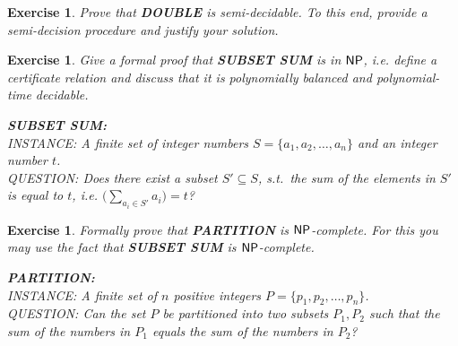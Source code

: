 \documentclass [11pt]{article}
\newtheorem{exercise}[theorem]{Exercise}
\newcommand{\ccfont}[1]{\protect\mathsf{#1}}
\newcommand{\NP}{\ccfont{NP}}
\newcommand{\solution}[1]{\noindent {\bf Solution.}  #1}
\begin{document}
\begin{exercise}
 Prove that \textbf{DOUBLE} is semi-decidable. To this end, provide a semi-decision procedure and justify your solution.
\end{exercise}




\begin{exercise}
  Give a formal proof that \textbf{SUBSET SUM} is in $\NP$, i.e. define a
  certificate relation and discuss that it is polynomially balanced and
  polynomial-time decidable.
  
\medskip

\noindent \textbf{SUBSET SUM:} \\
INSTANCE: A finite set of integer numbers $S=\{a_1, a_2, \ldots, a_n\}$ and an integer number $t$. \\
QUESTION: Does there exist a subset $S'\subseteq S$, s.t.\ the sum of the elements in $S'$  is equal to $t$, i.e. $\big(\sum_{a_i \in S'} a_i\big) = t$?
  
\end{exercise}




\begin{exercise}
  \label{ex:partition}
  Formally prove that \textbf{PARTITION} is $\NP$-complete. For this you may use
  the fact that \textbf{SUBSET SUM} is $\NP$-complete.   

\medskip     
   
\noindent \textbf{PARTITION:} \\
INSTANCE: A finite set of $n$ positive integers $P=\{p_1, p_2, \ldots, p_n\}$. \\
QUESTION: Can the set $P$ be partitioned into two subsets $P_1, P_2$ such that the sum of the numbers in $P_1$ equals the sum of the numbers in $P_2$? 
  

\end{exercise}



\newpage
\end{document}
